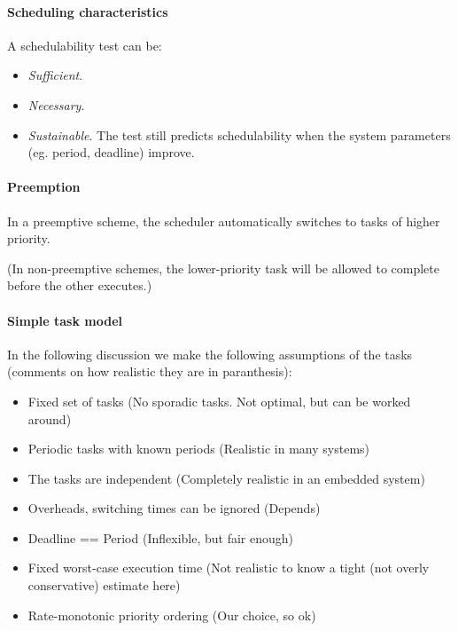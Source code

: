 \paragraph{Scheduling characteristics} A schedulability test can be:
\begin{itemize}[nolistsep,noitemsep]
  \item \textit{Sufficient}.
  \item \textit{Necessary}.
  \item \textit{Sustainable}. The test still predicts schedulability when the system parameters (eg. period, deadline) improve.
\end{itemize}

\paragraph{Preemption} In a preemptive scheme, the scheduler automatically switches to tasks of higher priority.

(In non-preemptive schemes, the lower-priority task will be allowed to complete before the other executes.)

\paragraph{Simple task model} In the following discussion we make the following assumptions of the tasks (comments on how realistic they are in paranthesis):
\begin{itemize}[nolistsep,noitemsep]
  \item Fixed set of tasks (No sporadic tasks. Not optimal, but can be worked around)
  \item Periodic tasks with known periods (Realistic in many systems)
  \item The tasks are independent (Completely realistic in an embedded system)
  \item Overheads, switching times can be ignored (Depends)
  \item Deadline == Period (Inflexible, but fair enough)
  \item Fixed worst-case execution time (Not realistic to know a tight (not overly conservative) estimate here)
  \item Rate-monotonic priority ordering (Our choice, so ok)
\end{itemize}

